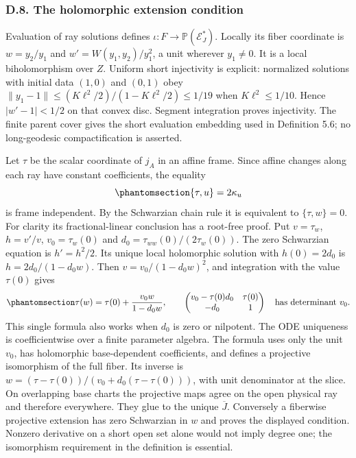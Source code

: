 \documentclass[
  english,
  11pt,
  reqno]{amsart}
\begin{document}
\protect{}\label{sec:gg-affine-projective-extension}

\subsubsection{D.8. The holomorphic extension
condition}\label{d.8.-the-holomorphic-extension-condition}

Evaluation of ray solutions defines
\(\iota:F\to\mathbb P(\mathcal E_J^*)\). Locally its fiber coordinate is
\(w=y_2/y_1\) and \(w'=W(y_1,y_2)/y_1^2\), a unit wherever \(y_1\ne0\).
It is a local biholomorphism over \(Z\). Uniform short injectivity is
explicit: normalized solutions with initial data \((1,0)\) and \((0,1)\)
obey \(\|y_1-1\|\le(K\ell^2/2)/(1-K\ell^2/2)\le1/19\) when
\(K\ell^2\le1/10\). Hence \(|w'-1|<1/2\) on that convex disc. Segment
integration proves injectivity. The finite parent cover gives the short
evaluation embedding used in Definition 5.6; no long-geodesic
compactification is asserted.

Let \(\tau\) be the scalar coordinate of \(j_A\) in an affine frame.
Since affine changes along each ray have constant coefficients, the
equality
\begin{equation}\protect\phantomsection\label{eq:gg-affine-schwarzian}{
 \{\tau,u\}=2\kappa_u
}\end{equation} is frame independent. By the Schwarzian chain rule it is
equivalent to \(\{\tau,w\}=0\). For clarity its fractional-linear
conclusion has a root-free proof. Put \(v=\tau_w\), \(h=v'/v\),
\(v_0=\tau_w(0)\) and \(d_0=\tau_{ww}(0)/(2\tau_w(0))\). The zero
Schwarzian equation is \(h'=h^2/2\). Its unique local holomorphic
solution with \(h(0)=2d_0\) is \(h=2d_0/(1-d_0w)\). Then
\(v=v_0/(1-d_0w)^2\), and integration with the value \(\tau(0)\) gives
\begin{equation}\protect\phantomsection\label{eq:gg-affine-projective-jet-formula}{
 \tau(w)=\tau(0)+\frac{v_0w}{1-d_0w},\qquad
 \begin{pmatrix}
 v_0-\tau(0)d_0&\tau(0)\\-d_0&1
 \end{pmatrix}
 \quad\text{has determinant }v_0 .
}\end{equation} This single formula also works when \(d_0\) is zero or
nilpotent. The ODE uniqueness is coefficientwise over a finite parameter
algebra. The formula uses only the unit \(v_0\), has holomorphic
base-dependent coefficients, and defines a projective isomorphism of the
full fiber. Its inverse is \(w=(\tau-\tau(0))/(v_0+d_0(\tau-\tau(0)))\),
with unit denominator at the slice. On overlapping base charts the
projective maps agree on the open physical ray and therefore everywhere.
They glue to the unique \(\overline J\). Conversely a fiberwise
projective extension has zero Schwarzian in \(w\) and proves the
displayed condition. Nonzero derivative on a short open set alone would
not imply degree one; the isomorphism requirement in the definition is
essential.
\end{document}
